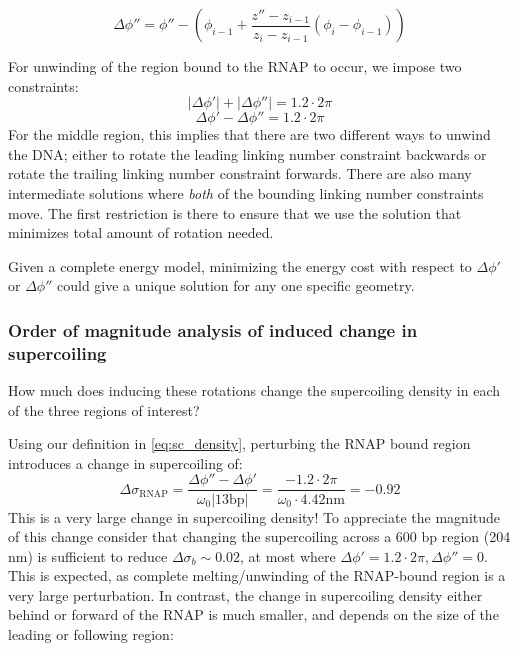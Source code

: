 \documentclass[11pt]{article}
\begin{document}
\begin{equation}
    \Delta \phi'' = \phi'' - \left(\phi_{i - 1} + \frac{z'' - z_{i-1}}{z_i - z_{i-1}} (\phi_i - \phi_{i-1})\right)
\end{equation}

For unwinding of the region bound to the RNAP to occur, we impose two constraints:
\begin{equation}
    |\Delta \phi'| + |\Delta \phi''| = 1.2 \cdot 2 \pi
\end{equation}
\begin{equation}
    \Delta \phi' - \Delta \phi'' = 1.2 \cdot 2\pi
\end{equation}
For the middle region, this implies that there are two different ways to unwind the DNA; either to rotate the leading linking number constraint backwards or rotate the trailing linking number constraint forwards. There are also many intermediate solutions where \emph{both} of the bounding linking number constraints move. The first restriction is there to ensure that we use the solution that minimizes total amount of rotation needed.

Given a complete energy model, minimizing the energy cost with respect to \(\Delta \phi'\) or \(\Delta \phi''\) could give a unique solution for any one specific geometry.

\subsubsection{Order of magnitude analysis of induced change in supercoiling}
How much does inducing these rotations change the supercoiling density in each of the three regions of interest?

Using our definition in \autoref{eq:sc_density}, perturbing the RNAP bound region introduces a change in supercoiling of:
\begin{equation}
    \Delta \sigma_\text{RNAP} = \frac{\Delta \phi'' - \Delta \phi'}{\omega_0 |13 \text{bp}|} = \frac{-1.2 \cdot 2\pi}{\omega_0 \cdot 4.42 \text{nm}} = -0.92
    \label{eq:delta_sigma_rnap}
\end{equation}
This is a very large change in supercoiling density! To appreciate the magnitude of this change consider that changing the supercoiling across a 600 bp region (204 nm) is sufficient to reduce \(\Delta \sigma_b \sim 0.02\), at most where \(\Delta \phi' = 1.2 \cdot 2  \pi, \Delta \phi'' = 0\). This is expected, as complete melting/unwinding of the RNAP-bound region is a very large perturbation. In contrast, the change in supercoiling density either behind or forward of the RNAP is much smaller, and depends on the size of the leading or following region:
\end{document}
